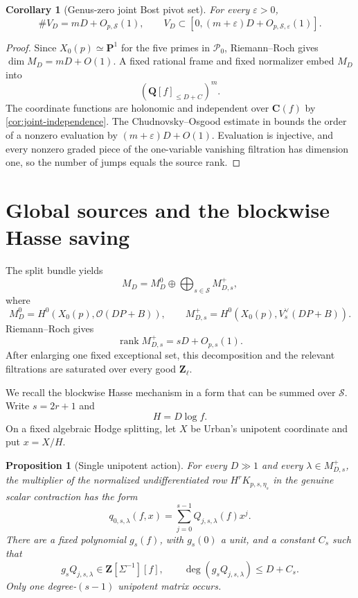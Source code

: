 \documentclass[11pt]{article}
\newtheorem{proposition}[proposition]{Proposition}
\newtheorem{corollary}[corollary]{Corollary}
\theoremstyle{definition}
\theoremstyle{remark}
\newcommand{\Q}{\mathbf Q}
\newcommand{\Z}{\mathbf Z}
\newcommand{\C}{\mathbf C}
\newcommand{\rank}{\operatorname{rank}}
\newcommand{\calO}{\mathcal O}
\begin{document}
\begin{corollary}[Genus-zero joint Bost pivot set]\label{cor:joint-zero}
For every $\varepsilon>0$,
\begin{equation}\label{eq:joint-zero}
 \#V_D=mD+O_{p,\mathcal S}(1),
 \qquad
 V_D\subset[0,(m+\varepsilon)D+O_{p,\mathcal S,\varepsilon}(1)].
\end{equation}
\end{corollary}

\begin{proof}
Since $X_0(p)\simeq\mathbf P^1$ for the five primes in $\mathcal P_0$,
Riemann--Roch gives $\dim M_D=mD+O(1)$.  A fixed rational frame and fixed
normalizer embed $M_D$ into
\[
 (\Q[f]_{\le D+C})^m.
\]
The coordinate functions are holonomic and independent over $\C(f)$ by
\cref{cor:joint-independence}.  The Chudnovsky--Osgood estimate in
\cite[Theorem~3.2.13]{CDT2024} bounds the order of a nonzero evaluation by
$(m+\varepsilon)D+O(1)$.  Evaluation is injective, and every nonzero graded
piece of the one-variable vanishing filtration has dimension one, so the
number of jumps equals the source rank.
\end{proof}

\section{Global sources and the blockwise Hasse saving}\label{sec:hasse}

The split bundle yields
\begin{equation}\label{eq:source-split}
 M_D=M_D^0\oplus\bigoplus_{s\in\mathcal S}M_{D,s}^+,
\end{equation}
where
\[
 M_D^0=H^0(X_0(p),\calO(DP+B)),
 \qquad
 M_{D,s}^+=H^0(X_0(p),V_s^\vee(DP+B)).
\]
Riemann--Roch gives
\begin{equation}\label{eq:block-source-rank}
 \rank M_{D,s}^+=sD+O_{p,s}(1).
\end{equation}
After enlarging one fixed exceptional set, this decomposition and the relevant
filtrations are saturated over every good $\Z_\ell$.

We recall the blockwise Hasse mechanism in a form that can be summed over
$\mathcal S$.  Write $s=2r+1$ and
\[
 H=D\log f.
\]
On a fixed algebraic Hodge splitting, let $X$ be Urban's unipotent coordinate
and put $x=X/H$.

\begin{proposition}[Single unipotent action]\label{prop:single-action}
For every $D\gg1$ and every $\lambda\in M_{D,s}^+$, the multiplier of the
normalized undifferentiated row $H^rK_{p,s,\eta_s}$ in the genuine scalar
contraction has the form
\begin{equation}\label{eq:q0}
 q_{0,s,\lambda}(f,x)=\sum_{j=0}^{s-1}Q_{j,s,\lambda}(f)x^j.
\end{equation}
There are a fixed polynomial $g_s(f)$, with $g_s(0)$ a unit, and a constant
$C_s$ such that
\begin{equation}\label{eq:q0-degree}
 g_sQ_{j,s,\lambda}\in\Z[\Sigma^{-1}][f],
 \qquad
 \deg(g_sQ_{j,s,\lambda})\le D+C_s.
\end{equation}
Only one degree-$(s-1)$ unipotent matrix occurs.
\end{proposition}
\end{document}
